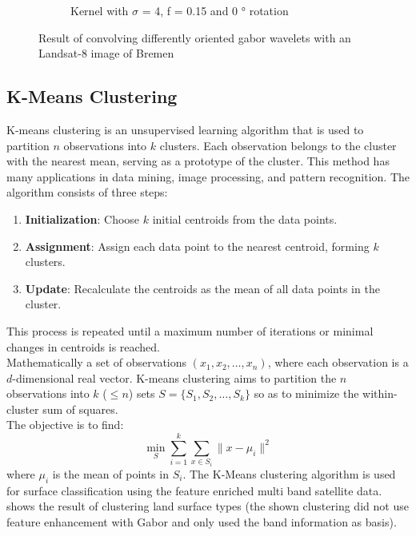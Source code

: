 \documentclass[12pt,a4paper, english]{article}
\begin{document}
\begin{figure}[!htbp]
\begin{subfigure}[b]{0.45\textwidth}
         \caption{Kernel with $\sigma$ = 4, f = 0.15 and 0 ° rotation}\label{fig:feat06}
     \end{subfigure}
        \caption{Result of convolving differently oriented gabor wavelets with an Landsat-8 image of Bremen}\label{fig:gaborExample}
    \end{figure}
%
\newpage
 \subsection{K-Means Clustering}\label{sec:kmeans}
K-means clustering is an unsupervised learning algorithm that is used to partition $n$ observations into $k$ clusters. 
Each observation belongs to the cluster with the nearest mean, serving as a prototype of the cluster. 
This method has many applications in data mining, image processing, and pattern recognition.
The algorithm consists of three steps:
\begin{enumerate}
    \item \textbf{Initialization}: Choose $k$ initial centroids from the data points.
    \item \textbf{Assignment}: Assign each data point to the nearest centroid, forming $k$ clusters.
    \item \textbf{Update}: Recalculate the centroids as the mean of all data points in the cluster. 
\end{enumerate}
This process is repeated until a maximum number of iterations or minimal changes in centroids is reached.\cite{Sinaga2020}\\ %
Mathematically a set of observations $(x_1, x_2, \ldots, x_n)$, where each observation is a $d$-dimensional real vector.
K-means clustering aims to partition the $n$ observations into $k$ ($\leq n$) sets $S = \{S_1, S_2, \ldots, S_k\}$ so as to minimize the within-cluster sum of squares. \\
The objective is to find:
\begin{equation}
    \min_{S} \sum_{i=1}^{k} \sum_{x \in S_i} \| x - \mu_i \|^2
\end{equation}
where $\mu_i$ is the mean of points in $S_i$.
%
The K-Means clustering algorithm is used for surface classification using the feature enriched multi band satellite data.
 shows the result of clustering land surface types (the shown clustering did not use feature enhancement with Gabor and only used the band information as basis).%
\end{document}
